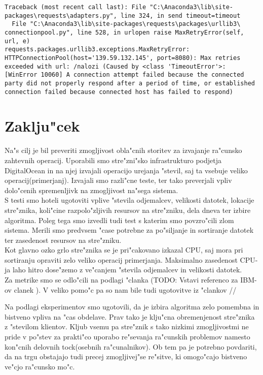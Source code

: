 \begin{itemize}
	\begin{lstlisting}
Traceback (most recent call last): File "C:\Anaconda3\lib\site-packages\requests\adapters.py", line 324, in send timeout=timeout
  File "C:\Anaconda3\lib\site-packages\requests\packages\urllib3\ connectionpool.py", line 528, in urlopen raise MaxRetryError(self, url, e)
requests.packages.urllib3.exceptions.MaxRetryError: HTTPConnectionPool(host='139.59.132.145', port=8080): Max retries exceeded with url: /nalozi (Caused by <class 'TimeoutError'>: [WinError 10060] A connection attempt failed because the connected party did not properly respond after a period of time, or established connection failed because connected host has failed to respond)
	\end{lstlisting}
		
    \end{itemize}


\section{Zaklju"cek}

Na"s cilj je bil preveriti zmogljivost obla"cnih storitev za izvajanje ra"cunsko zahtevnih operacij. Uporabili smo stre"zni"sko infrastrukturo podjetja DigitalOcean in na njej izvajali operacijo urejanja "stevil, saj ta vsebuje veliko operacij(primerjanj).
Izvajali smo razli"cne teste, ter tako preverjali vpliv dolo"cenih spremenljivk na zmogljivost na"sega sistema. \\
S testi smo hoteli ugotoviti vplive "stevila odjemalcev, velikosti datotek, lokacije stre"znika, koli"cine razpolo"zljivih resursov na stre"zniku, dela dneva ter izbire algoritma. Poleg tega smo izvedli tudi test s katerim smo povzro"cili zlom sistema.
Merili smo predvsem "case potrebne za po"siljanje in sortiranje datotek ter zasedenost resursov na stre"zniku.\\
Kot glavno ozko grlo stre"znika se je pri"cakovano izkazal CPU, saj mora pri sortiranju opraviti zelo veliko operacij primerjanja. Maksimalno zasedenost CPU-ja laho hitro dose"zemo z ve"canjem "stevila odjemalcev in velikosti datotek.\\	
Za metrike smo se odlo"cili na podlagi "clanka (TODO: Vstavi referenco za IBM-ov clanek ). V veliko pomo"c pa so nam bile tudi ugotovitve iz "clankov //

Na podlagi eksperimentov smo ugotovili, da je izbira algoritma zelo pomembna in bistveno vpliva na "cas obdelave. Prav tako je klju"cna obremenjenost stre"znika z "stevilom klientov.
Kljub vsemu pa stre"znik s tako nizkimi zmogljivostmi ne pride v po"stev za prakti"co uporabo re"sevanja ra"cunskih problemov namesto kon"cnih delovnih tock(osebnih ra"cunalnikov). Ob tem pa je potrebno povdariti, da na trgu obstajajo tudi precej
zmogljivej"se re"sitve, ki omogo"cajo bistveno ve"cjo ra"cunsko mo"c. 





